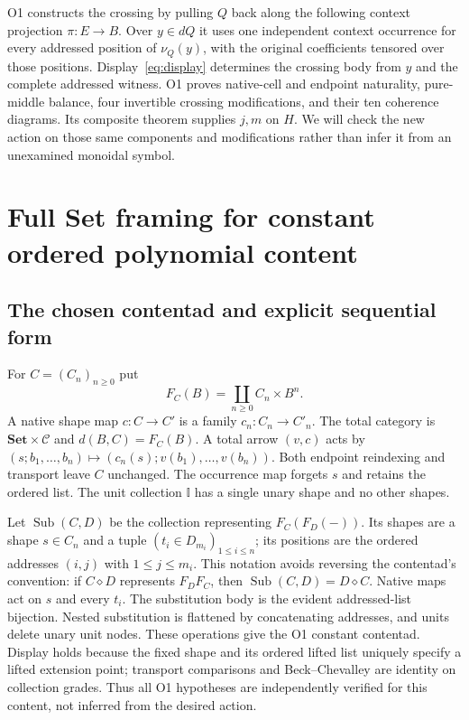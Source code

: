 \documentclass[11pt,a4paper]{article}
\theoremstyle{definition}
\newcommand{\Set}{\mathbf{Set}}
\newcommand{\C}{\mathcal C}
\newcommand{\diamondc}{\mathbin{\diamond}}
\newcommand{\Sub}{\operatorname{Sub}}
\begin{document}
O1 constructs the crossing by pulling $Q$ back along the following
context projection $\pi:E\to B$. Over $y\in dQ$ it uses one independent
context occurrence for every addressed position of $\nu_Q(y)$, with the
original coefficients tensored over those positions. Display~\eqref{eq:display}
determines the crossing body from $y$ and the complete addressed witness.
O1 proves native-cell and endpoint naturality, pure-middle balance, four
invertible crossing modifications, and their ten coherence diagrams. Its
composite theorem supplies $j,m$ on $H$. We will check the new action on
those same components and modifications rather than infer it from an
unexamined monoidal symbol.

\section{Full Set framing for constant ordered polynomial content}\label{sec:constant}

\subsection{The chosen contentad and explicit sequential form}
For $C=(C_n)_{n\ge0}$ put
\[
 F_C(B)=\coprod_{n\ge0}C_n\times B^n.
\]
A native shape map $c:C\to C'$ is a family $c_n:C_n\to C'_n$.
The total category is $\Set\times\C$ and
$d(B,C)=F_C(B)$. A total arrow $(v,c)$ acts by
$(s;b_1,\ldots,b_n)\mapsto(c_n(s);v(b_1),\ldots,v(b_n))$.
Both endpoint reindexing and transport leave $C$ unchanged. The occurrence
map forgets $s$ and retains the ordered list. The unit collection $\mathbb I$
has a single unary shape and no other shapes.

Let $\Sub(C,D)$ be the collection representing $F_C(F_D(-))$.
Its shapes are a shape $s\in C_n$ and a tuple
$(t_i\in D_{m_i})_{1\le i\le n}$; its positions are the ordered addresses
$(i,j)$ with $1\le j\le m_i$. This notation avoids reversing the
contentad's convention: if $C\diamondc D$ represents $F_DF_C$, then
$\Sub(C,D)=D\diamondc C$. Native maps act on $s$ and every $t_i$.
The substitution body is the evident addressed-list bijection. Nested
substitution is flattened by concatenating addresses, and units delete
unary unit nodes. These operations give the O1 constant contentad. Display
holds because the fixed shape and its ordered lifted list uniquely specify
a lifted extension point; transport comparisons and Beck--Chevalley are
identity on collection grades. Thus all O1 hypotheses are independently
verified for this content, not inferred from the desired action.
\end{document}

